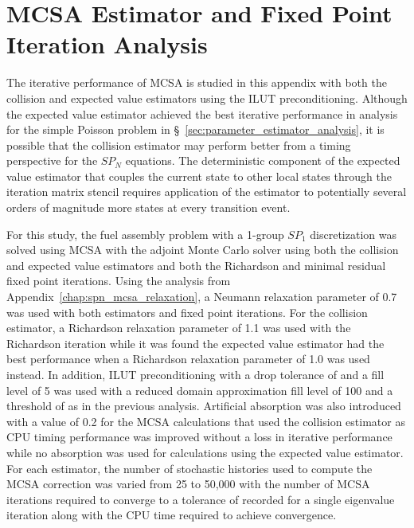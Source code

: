 \chapter{MCSA Estimator and Fixed Point\\ Iteration Analysis}
\label{chap:spn_estimator_comparison}
The iterative performance of MCSA is studied in this appendix with
both the collision and expected value estimators using the ILUT
preconditioning. Although the expected value estimator achieved the
best iterative performance in analysis for the simple Poisson problem
in \S~\ref{sec:parameter_estimator_analysis}, it is possible that the
collision estimator may perform better from a timing perspective for
the $SP_N$ equations. The deterministic component of the expected
value estimator that couples the current state to other local states
through the iteration matrix stencil requires application of the
estimator to potentially several orders of magnitude more states at
every transition event.

For this study, the fuel assembly problem with a 1-group $SP_1$
discretization was solved using MCSA with the adjoint Monte Carlo
solver using both the collision and expected value estimators and both
the Richardson and minimal residual fixed point iterations. Using the
analysis from Appendix~\ref{chap:spn_mcsa_relaxation}, a Neumann
relaxation parameter of 0.7 was used with both estimators and fixed
point iterations. For the collision estimator, a Richardson relaxation
parameter of 1.1 was used with the Richardson iteration while it was
found the expected value estimator had the best performance when a
Richardson relaxation parameter of 1.0 was used instead. In addition,
ILUT preconditioning with a drop tolerance of  and a fill
level of 5 was used with a reduced domain approximation fill level of
100 and a threshold of  as in the previous
analysis. Artificial absorption was also introduced with a value of
0.2 for the MCSA calculations that used the collision estimator as CPU
timing performance was improved without a loss in iterative
performance while no absorption was used for calculations using the
expected value estimator. For each estimator, the number of stochastic
histories used to compute the MCSA correction was varied from 25 to
50,000 with the number of MCSA iterations required to converge to a
tolerance of  recorded for a single eigenvalue iteration
along with the CPU time required to achieve convergence.

